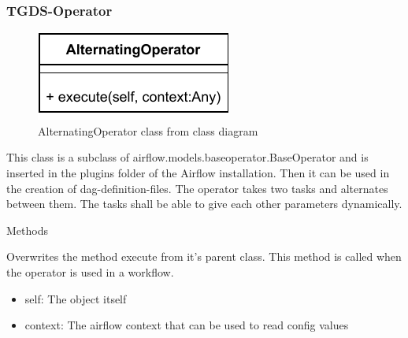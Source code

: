 \subsubsection{TGDS-Operator}


\begin{figure}[h]
\centerline{\includegraphics[scale=1]{res/Klassen/AlternatingOperator.pdf}}
\caption{AlternatingOperator class from class diagram}
\end{figure}

This class is a subclass of airflow.models.baseoperator.BaseOperator and is inserted in the plugins folder of the Airflow installation. Then it can be used in the creation of dag-definition-files. The operator takes two tasks and alternates between them. The tasks shall be able to give each other parameters dynamically.

\begin{methodenv}{Methods}

Overwrites the method execute from it's parent class. This method is called when the operator is used in a workflow. 

\begin{itemize}
	\item{self:}
	The object itself
	\item{context:}
	The airflow context that can be used to read config values
\end{itemize}

\end{methodenv}

\newpage